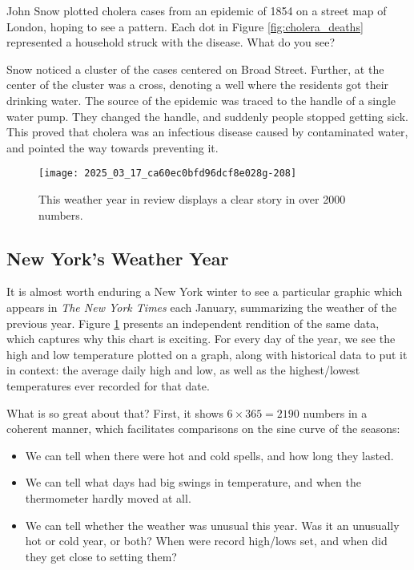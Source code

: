 \documentclass[10pt]{article}
\begin{document}
John Snow plotted cholera cases from an epidemic of 1854 on a street map of London, hoping to see a pattern. Each dot in Figure \ref{fig:cholera_deaths} represented a household struck with the disease. What do you see?

Snow noticed a cluster of the cases centered on Broad Street. Further, at the center of the cluster was a cross, denoting a well where the residents got their drinking water. The source of the epidemic was traced to the handle of a single water pump. They changed the handle, and suddenly people stopped getting sick. This proved that cholera was an infectious disease caused by contaminated water, and pointed the way towards preventing it.

\begin{figure}[htbp]
    \centering
    \texttt{[image: 2025\_03\_17\_ca60ec0bfd96dcf8e028g-208]}
    \caption{This weather year in review displays a clear story in over 2000 numbers.}
    \label{fig:weather_year_review}
\end{figure}

\subsection{New York's Weather Year}
It is almost worth enduring a New York winter to see a particular graphic which appears in \textit{The New York Times} each January, summarizing the weather of the previous year. Figure \ref{fig:weather_year_review} presents an independent rendition of the same data, which captures why this chart is exciting. For every day of the year, we see the high and low temperature plotted on a graph, along with historical data to put it in context: the average daily high and low, as well as the highest/lowest temperatures ever recorded for that date.

What is so great about that? First, it shows $6 \times 365=2190$ numbers in a coherent manner, which facilitates comparisons on the sine curve of the seasons:

\begin{itemize}
  \item We can tell when there were hot and cold spells, and how long they lasted.
  \item We can tell what days had big swings in temperature, and when the thermometer hardly moved at all.
  \item We can tell whether the weather was unusual this year. Was it an unusually hot or cold year, or both? When were record high/lows set, and when did they get close to setting them?
\end{itemize}
\end{document}
